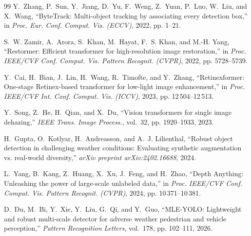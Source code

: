 \documentclass{article}
\begin{document}
\begin{thebibliography}{99}
Y.~Zhang, P.~Sun, Y.~Jiang, D.~Yu, F.~Weng, Z.~Yuan, P.~Luo, W.~Liu, and X.~Wang,
``ByteTrack: Multi-object tracking by associating every detection box,''
in \emph{Proc. Eur. Conf. Comput. Vis. (ECCV)}, 2022, pp. 1--21.

S.~W. Zamir, A.~Arora, S.~Khan, M.~Hayat, F.~S. Khan, and M.-H. Yang,
``Restormer: Efficient transformer for high-resolution image restoration,''
in \emph{Proc. IEEE/CVF Conf. Comput. Vis. Pattern Recognit. (CVPR)}, 2022, pp. 5728--5739.

Y.~Cai, H.~Bian, J.~Lin, H.~Wang, R.~Timofte, and Y.~Zhang,
``Retinexformer: One-stage Retinex-based transformer for low-light image enhancement,''
in \emph{Proc. IEEE/CVF Int. Conf. Comput. Vis. (ICCV)}, 2023, pp. 12\,504--12\,513.

Y.~Song, Z.~He, H.~Qian, and X.~Du,
``Vision transformers for single image dehazing,''
\emph{IEEE Trans. Image Process.}, vol.~32, pp. 1920--1933, 2023.

H.~Gupta, O.~Kotlyar, H.~Andreasson, and A.~J. Lilienthal,
``Robust object detection in challenging weather conditions: Evaluating synthetic augmentation vs. real-world diversity,''
\emph{arXiv preprint arXiv:2402.16688}, 2024.

L.~Yang, B.~Kang, Z.~Huang, X.~Xu, J.~Feng, and H.~Zhao,
``Depth Anything: Unleashing the power of large-scale unlabeled data,''
in \emph{Proc. IEEE/CVF Conf. Comput. Vis. Pattern Recognit. (CVPR)}, 2024, pp. 10\,371--10\,381.

D.~Du, M.~Bi, Y.~Xie, Y.~Liu, G.~Qi, and Y.~Guo,
``MLE-YOLO: Lightweight and robust multi-scale detector for adverse weather pedestrian and vehicle perception,''
\emph{Pattern Recognition Letters}, vol.~178, pp. 102--111, 2026.

\end{thebibliography}
\end{document}
